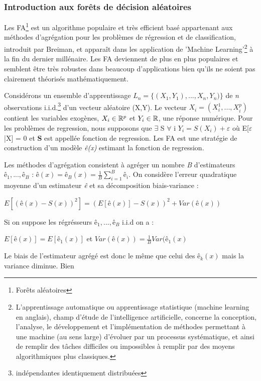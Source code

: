 	\subsubsection{Introduction aux forêts de décision aléatoires}
	Les FA\footnote{Forêts aléatoires} est un algorithme populaire et très efficient basé appartenant aux méthodes d'agrégation pour les problèmes de régression et de classification, introduit par Breiman\cite{BREI01}, et apparaît dans les application de 'Machine Learning'\footnote{L'apprentissage automatique ou apprentissage statistique (machine learning en anglais), champ d'étude de l'intelligence artificielle, concerne la conception, l'analyse, le développement et l'implémentation de méthodes permettant à une machine (au sens large) d'évoluer par un processus systématique, et ainsi de remplir des tâches difficiles ou impossibles à remplir par des moyens algorithmiques plus classiques.} à la fin du dernier millénaire\cite{DITRI99}. Les FA deviennent de plus en plus populaires et semblent être très robustes dans beaucoup d'applications bien qu'ils ne soient pas clairement théorisés mathématiquement\cite{BIA08}.
	\par
	Considérons un ensemble d'apprentissage ${L_n = \{(X_1, Y_1),...,X_n, Y_n)\}}$ de \textit{n} observations i.i.d.\footnote{indépendantes identiquement distribuées} d'un vecteur aléatoire (X,Y). Le vecteur ${X_i = (X_i^1,...,X_i^p)}$ contient les variables exogènes, $X_i \in \mathbb{R}^p $ et $Y_i \in \mathbb{R} $, une réponse numérique. Pour les problèmes de regression, nous supposons que $ \exists$ S $\forall$ i $ Y_i=S(X_i)+\varepsilon$ où E[$\varepsilon$|X] = 0 et \textbf{S} est appellée fonction de regression. Les FA est une stratégie de construction d'un modèle \textit{ê(x)} estimant la fonction de regression.
	\par
	Les méthodes d’agrégation consistent à agréger un nombre \textit{B} d’estimateurs $ê_1,...,ê_\textit{B}$ : ${ê(x) = ê_B(x) =  \frac{1}{B} \sum_{i=1}^{B} ê_i}$. On considère l’erreur quadratique moyenne d’un estimateur \textit{ê} et sa décomposition biais-variance :
	\begin{center}
	${E[(ê(x)-S(x))^2] = (E[ê(x)] - S(x))^2 + Var(ê(x))}$
	\end{center}
	Si on suppose les régrésseurs $ê_1,...,ê_B$ i.i.d on a :
	\begin{center}
		$E[ê(x)] = E[ê_1(x)]$ et $Var(ê(x)) = \frac{1}{B} Var(ê_1(x)$
	\end{center}
	Le biais de l’estimateur agrégé est donc le même que celui des $ê_k(x)$ mais la variance diminue. Bien
